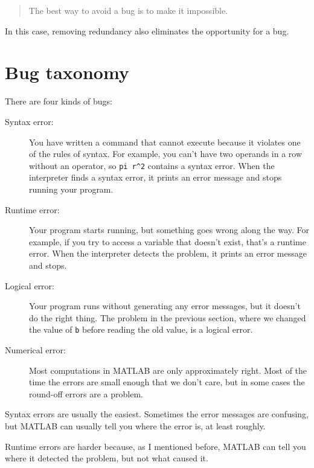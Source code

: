 \begin{quote}
The best way to avoid a bug is to make it impossible.
\end{quote}

In this case, removing redundancy also eliminates the opportunity for
a bug.


\section{Bug taxonomy}

There are four kinds of bugs:


\begin{description}

\item[Syntax error:] You have written a command that cannot
execute because it violates one of the rules of syntax.  For example,
you can't have two operands in a row without an operator, so
\verb+pi r^2+ contains a syntax error.  When the interpreter finds a syntax
error, it prints an error message and stops running your program.

\item[Runtime error:] Your program starts running, but something goes
wrong along the way.  For example, if you try to access a variable
that doesn't exist, that's a runtime error.  When the interpreter detects the
problem, it prints an error message and stops.

\item[Logical error:] Your program runs without generating any error
messages, but it doesn't do the right thing.  The problem in the
previous section, where we changed the value of {\tt b} before
reading the old value, is a logical error.

\item[Numerical error:] Most computations in MATLAB are only
approximately right.  Most of the time the errors are small enough
that we don't care, but in some cases the round-off errors are a problem.

\end{description}

Syntax errors are usually the easiest.  Sometimes the error messages
are confusing, but MATLAB can usually tell you where the error is, at
least roughly.

Runtime errors are harder because, as I mentioned before, MATLAB
can tell you where it detected the problem, but not what caused it.

